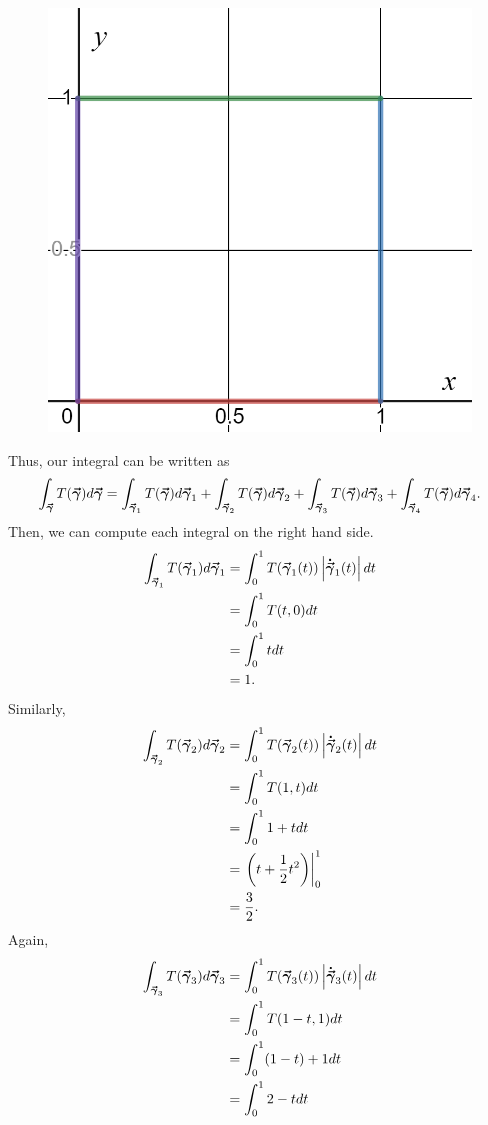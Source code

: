 \documentclass[12pt]{article} %
\begin{document}
\begin{solution}
\begin{enumerate}[(a)]
\begin{figure}[H]
			\includegraphics[width=.6\textwidth]{Images/plate_boundary.png}
		\end{figure}
		Thus, our integral can be written as
		\[
		\int_{\boldsymbol{\vec{\gamma}}} T(\boldsymbol{\vec{\gamma}}) d\boldsymbol{\vec{\gamma}} = \int_{\boldsymbol{\vec{\gamma}}_1} T(\boldsymbol{\vec{\gamma}}) d\boldsymbol{\vec{\gamma}}_1 + \int_{\boldsymbol{\vec{\gamma}}_2} T(\boldsymbol{\vec{\gamma}}) d\boldsymbol{\vec{\gamma}}_2 + \int_{\boldsymbol{\vec{\gamma}}_3} T(\boldsymbol{\vec{\gamma}}) d\boldsymbol{\vec{\gamma}}_3 + \int_{\boldsymbol{\vec{\gamma}}_4} T(\boldsymbol{\vec{\gamma}}) d\boldsymbol{\vec{\gamma}}_4.
		\]
		Then, we can compute each integral on the right hand side.
		\begin{align*}
			\int_{\boldsymbol{\vec{\gamma}}_1} T(\boldsymbol{\vec{\gamma}}_1) d\boldsymbol{\vec{\gamma}}_1 &= \int_0^1 T(\boldsymbol{\vec{\gamma}}_1(t))\left|\boldsymbol{\dot{\vec{\gamma}}}_1(t)\right|dt\\
			&= \int_0^1 T(t,0) dt\\
			&= \int_0^1 t dt\\
			&= 1.
		\end{align*}
		Similarly, 
		\begin{align*}
				\int_{\boldsymbol{\vec{\gamma}}_2} T(\boldsymbol{\vec{\gamma}}_2) d\boldsymbol{\vec{\gamma}}_2 &= \int_0^1 T(\boldsymbol{\vec{\gamma}}_2(t))\left|\boldsymbol{\dot{\vec{\gamma}}}_2(t)\right|dt\\
				&= \int_0^1 T(1,t) dt\\
				&= \int_0^1 1+t dt\\
				&= \left.\left(t+\frac{1}{2}t^2\right)\right\vert_0^1\\
				&= \frac{3}{2}.
		\end{align*}	
		Again,
		\begin{align*}
				\int_{\curvegamma_3} T(\curvegamma_3) d\curvegamma_3 &= \int_0^1 T(\curvegamma_3(t))\left|\tangentgamma_3(t)\right|dt\\
				&= \int_0^1 T(1-t,1) dt\\
				&= \int_0^1 (1-t)+1 dt\\
				&= \int_0^1 2-tdt\\

\end{align*}
\end{enumerate}
\end{solution}
\end{document}
